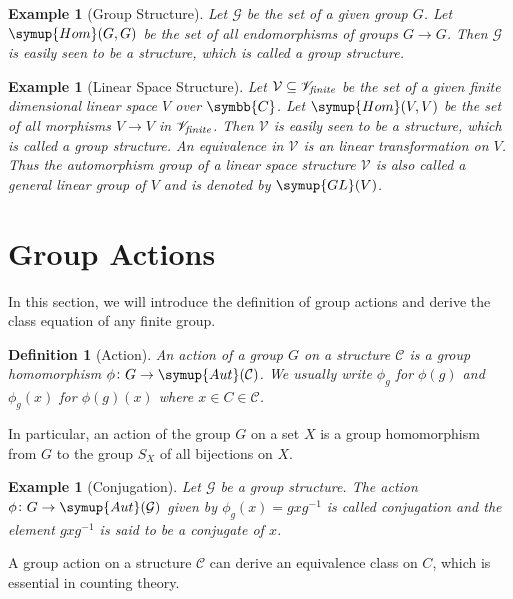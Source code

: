 \documentclass{assignment}[2019/10/15]
\theoremstyle{plain}
\newtheorem{definition}[theorem]{Definition}
\newtheorem{example}[theorem]{Example}
\newcommand{\BC}{\symbb{C}}
\newcommand{\Hom}{\mathop{}\!\symup{Hom}}
\newcommand{\Aut}{\mathop{}\!\symup{Aut}}
\newcommand{\GL}{\mathop{}\!\symup{GL}}
\numberwithin{equation}{section}
\begin{document}
    \begin{example}[Group Structure]
        Let $\mathcal{G}$ be the set of a given group $G$. Let $\Hom(G, G)$ be the set of all endomorphisms of groups $G\to G$. Then $\mathcal{G}$ is easily seen to be a structure, which is called a \emph{group structure}.
    \end{example}

    \begin{example}[Linear Space Structure]
        Let $\mathcal{V}\subseteq \mathscr{V}_{\text{\it finite}}$ be the set of a given finite dimensional linear space $V$ over $\BC$. Let $\Hom(V, V)$ be the set of all morphisms $V\to V$ in $\mathscr{V}_{\text{\it finite}}$. Then $\mathcal{V}$ is easily seen to be a structure, which is called a \emph{group structure}. An equivalence in $\mathcal{V}$ is an linear transformation on $V$. Thus the automorphism group of a linear space structure $\mathcal{V}$ is also called a \emph{general linear group} of $V$ and is denoted by $\GL(V)$.
    \end{example}

    \section{Group Actions}

    In this section, we will introduce the definition of group actions and derive the class equation of any finite group.

    \begin{definition}[Action]
        An \emph{action} of a group $G$ on a structure $\mathcal{C}$ is a group homomorphism $\phi\colon G\to \Aut(\mathcal{C})$. We usually write $\phi_g$ for $\phi(g)$ and $\phi_g(x)$ for $\phi(g)(x)$ where $x\in C\in \mathcal{C}$.
    \end{definition}

    In particular, an action of the group $G$ on a set $X$ is a group homomorphism from $G$ to the group $S_X$ of all bijections on $X$.

    \begin{example}[Conjugation]
        Let $\mathcal{G}$ be a group structure. The action $\phi\colon G\to \Aut(\mathcal{G})$ given by $\phi_g(x) = gxg^{-1}$ is called \emph{conjugation} and the element $gxg^{-1}$ is said to be a \emph{conjugate} of $x$.
    \end{example}

    A group action on a structure $\mathcal{C}$ can derive an equivalence class on $C$, which is essential in counting theory.
\end{document}
